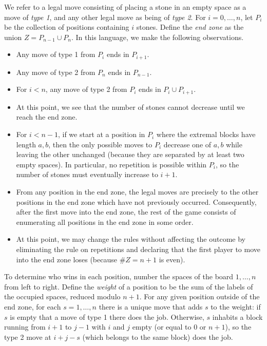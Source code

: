 {    We refer to a legal move consisting of placing a stone in an empty space as a move of \emph{type 1}, and any other legal move as being of \emph{type 2}.
    For $i=0,\dots,n$, let $P_i$ be the collection of positions containing $i$ stones. Define the \emph{end zone} as the union $Z = P_{n-1} \cup P_n$. In this language, we make the following observations.
    \begin{itemize}
        \item
            Any move of type 1 from $P_i$ ends in $P_{i+1}$.
        \item
            Any move of type 2 from $P_n$ ends in $P_{n-1}$.
        \item
            For $i < n$, any move of type 2 from $P_i$ ends in $P_i \cup P_{i+1}$.
        \item
            At this point, we see that  the number of stones cannot decrease until we reach the end zone.
        \item
            For $i < n-1$, if we start at a position in $P_i$ where the extremal blocks have length $a,b$, then the only possible moves to $P_i$ decrease one of $a,b$ while leaving the other unchanged (because they are separated by at least two empty spaces). In particular, no repetition is possible within $P_i$, so the number of stones must eventually increase to $i+1$.
        \item
            From any position in the end zone, the legal moves are precisely to the other positions in the end zone which have not previously occurred. Consequently, after the first move into the end zone, the rest of the game consists of enumerating all positions in the end zone in some order.
        \item
            At this point, we may change the rules without affecting the outcome by eliminating the rule on repetitions and declaring that the first player to move into the end zone loses (because $\# Z = n+1$ is even).
    \end{itemize}

    To determine who wins in each position, number the spaces of the board $1,\dots,n$ from left to right. Define the \emph{weight} of a position to be the sum of the labels of the occupied spaces, reduced modulo $n+1$. For any given position outside of the end zone, 
    for each $s=1,\dots,n$ there is a unique move that adds $s$ to the weight:
    if $s$ is empty that a move of type 1 there does the job.
    Otherwise, $s$ inhabits a block running from $i+1$ to $j-1$ with $i$ and $j$ empty (or equal to $0$ or $n+1$), so the type 2 move at $i+j-s$ (which belongs to the same block) does the job.

}
